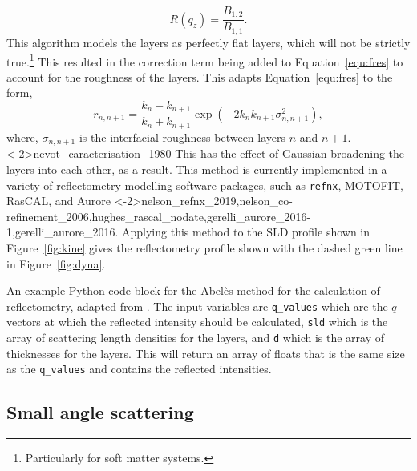 %
\begin{equation}
    R(q_z) = \frac{B_{1,2}}{B_{1,1}}.
\end{equation}
%
This algorithm models the layers as perfectly flat layers, which will not be strictly true.\footnote{Particularly for soft matter systems.}
This resulted in the correction term being added to Equation~\ref{equ:fres} to account for the roughness of the layers.
This adapts Equation~\ref{equ:fres} to the form,
%
\begin{equation}
    r_{n,n+1} = \frac{k_n - k_{n+1}}{k_n + k_{n+1}}\exp{(-2k_nk_{n+1}\sigma^2_{n,n+1})},
\end{equation}
%
where, $\sigma_{n,n+1}$ is the interfacial roughness between layers $n$ and $n+1$.\sidecite<-2\baselineskip>{nevot_caracterisation_1980}
This has the effect of Gaussian broadening the layers into each other, as a result.
This method is currently implemented in a variety of reflectometry modelling software packages, such as \texttt{refnx}, MOTOFIT, RasCAL, and Aurore \sidecite<-2\baselineskip>{nelson_refnx_2019,nelson_co-refinement_2006,hughes_rascal_nodate,gerelli_aurore_2016-1,gerelli_aurore_2016}.
Applying this method to the SLD profile shown in Figure~\ref{fig:kine} gives the reflectometry profile shown with the dashed green line in Figure~\ref{fig:dyna}.
%
\begin{listing}[t]
    \forcerectofloat
    \centering
    \caption{An example Python code block for the Abel\`{e}s method for the calculation of reflectometry, adapted from \cite{nelson_refnx_2019}. The input variables are \texttt{q\_values} which are the $q$-vectors at which the reflected intensity should be calculated, \texttt{sld} which is the array of scattering length densities for the layers, and \texttt{d} which is the array of thicknesses for the layers. This will return an array of floats that is the same size as the \texttt{q\_values} and contains the reflected intensities.}
    
    \label{cb:refl}
\end{listing}
%

\subsection{Small angle scattering}
\label{sec:sasanal}

